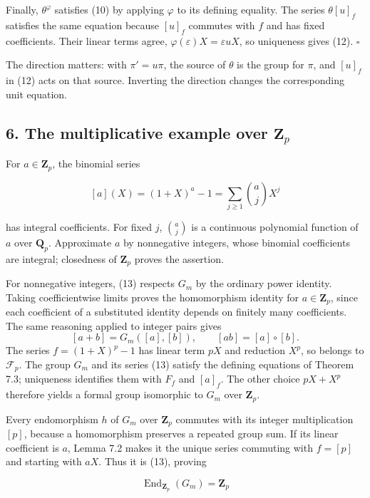 \documentclass[11pt,a4paper]{article}
\begin{document}
Finally, \(\theta^\varphi\) satisfies (10) by applying \(\varphi\) to
its defining equality. The series \(\theta[u]_f\) satisfies the same
equation because \([u]_f\) commutes with \(f\) and has fixed
coefficients. Their linear terms agree,
\(\varphi(\varepsilon)X=\varepsilon uX\), so uniqueness gives (12).
\(\square\)

The direction matters: with \(\pi'=u\pi\), the source of \(\theta\) is
the group for \(\pi\), and \([u]_f\) in (12) acts on that source.
Inverting the direction changes the corresponding unit equation.

\subsection{\texorpdfstring{6. The multiplicative example over
\(\mathbf Z_p\)}{6. The multiplicative example over \textbackslash mathbf Z\_p}}\label{the-multiplicative-example-over-mathbf-z_p}

For \(a\in\mathbf Z_p\), the binomial series

\[
[a](X)=(1+X)^a-1=\sum_{j\geq1}\binom aj X^j
\tag{13}
\]

has integral coefficients. For fixed \(j\), \(\binom aj\) is a
continuous polynomial function of \(a\) over \(\mathbf Q_p\).
Approximate \(a\) by nonnegative integers, whose binomial coefficients
are integral; closedness of \(\mathbf Z_p\) proves the assertion.

For nonnegative integers, (13) respects \(G_m\) by the ordinary power
identity. Taking coefficientwise limits proves the homomorphism identity
for \(a\in\mathbf Z_p\), since each coefficient of a substituted
identity depends on finitely many coefficients. The same reasoning
applied to integer pairs gives \[
[a+b]=G_m([a],[b]),\qquad [ab]=[a]\circ[b].
\] The series \(f=(1+X)^p-1\) has linear term \(pX\) and reduction
\(X^p\), so belongs to \(\mathcal F_p\). The group \(G_m\) and its
series (13) satisfy the defining equations of Theorem 7.3; uniqueness
identifies them with \(F_f\) and \([a]_f\). The other choice \(pX+X^p\)
therefore yields a formal group isomorphic to \(G_m\) over
\(\mathbf Z_p\).

Every endomorphism \(h\) of \(G_m\) over \(\mathbf Z_p\) commutes with
its integer multiplication \([p]\), because a homomorphism preserves a
repeated group sum. If its linear coefficient is \(a\), Lemma 7.2 makes
it the unique series commuting with \(f=[p]\) and starting with \(aX\).
Thus it is (13), proving

\[
\operatorname{End}_{\mathbf Z_p}(G_m)=\mathbf Z_p
\]
\end{document}
